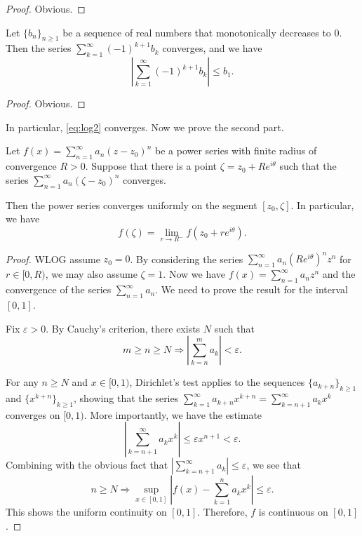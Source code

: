 \documentclass{article}
\begin{document}
\begin{proof}
    Obvious.
\end{proof}

\begin{corollary}
    Let $\{b_n\}_{n\geq 1}$ be a sequence of real numbers that monotonically decreases to $0$. Then the series $\sum_{k=1}^\infty (-1)^{k+1} b_k$ converges, and we have
    \[
        \left\vert \sum_{k=1}^\infty (-1)^{k+1} b_k \right\vert \leq b_1.
    \]
\end{corollary}

\begin{proof}
    Obvious.
\end{proof}

In particular, \eqref{eq:log2} converges. Now we prove the second part.

\begin{theorem}[Abel]
    Let $f(x) = \sum_{n=1}^\infty a_n (z-z_0)^n$ be a power series with finite radius of convergence $R>0$. Suppose that there is a point $\zeta=z_0+Re^{i\theta}$ such that the series $\sum_{n=1}^\infty a_n (\zeta-z_0)^n$ converges. 
    
    Then the power series converges uniformly on the segment $[z_0, \zeta]$. In particular, we have
    \[
        f(\zeta) = \lim_{r\to R^-} f(z_0+re^{i\theta}).
    \]
\end{theorem}

\begin{proof}
    WLOG assume $z_0=0$. By considering the series $\sum_{n=1}^\infty a_n \left(Re^{i\theta}\right)^n z^n$ for $r\in [0,R)$, we may also assume $\zeta=1$. Now we have $f(x) = \sum_{n=1}^\infty a_n z^n$ and the convergence of the series $\sum_{n=1}^\infty a_n$. We need to prove the result for the interval $[0,1]$.

    Fix $\varepsilon>0$. By Cauchy's criterion, there exists $N$ such that 
    \begin{equation*}
        m\geq n\geq N \Longrightarrow \left\vert \sum_{k=n}^m a_k \right\vert < \varepsilon.
    \end{equation*}

    For any $n\geq N$ and $x\in[0,1)$, Dirichlet's test applies to the sequences $\{a_{k+n}\}_{k\geq 1}$ and $\{x^{k+n}\}_{k\geq 1}$, showing that the series $\sum_{k=1}^\infty a_{k+n} x^{k+n}=\sum_{k=n+1}^\infty a_kx^k$ converges on $[0,1)$. More importantly, we have the estimate
    \[
        \left\vert \sum_{k=n+1}^\infty a_k x^k \right\vert \leq \varepsilon x^{n+1} <\varepsilon.
    \]
    Combining with the obvious fact that $\left\vert \sum_{k=n+1}^\infty a_k \right\vert \leq \varepsilon$, we see that
    \[
        n\geq N \Longrightarrow \sup_{x\in[0,1]} \left\vert f(x) - \sum_{k=1}^n a_k x^k \right\vert \leq \varepsilon.
    \]
    This shows the uniform continuity on $[0,1]$. Therefore, $f$ is continuous on $[0,1]$.
\end{proof}
\end{document}
